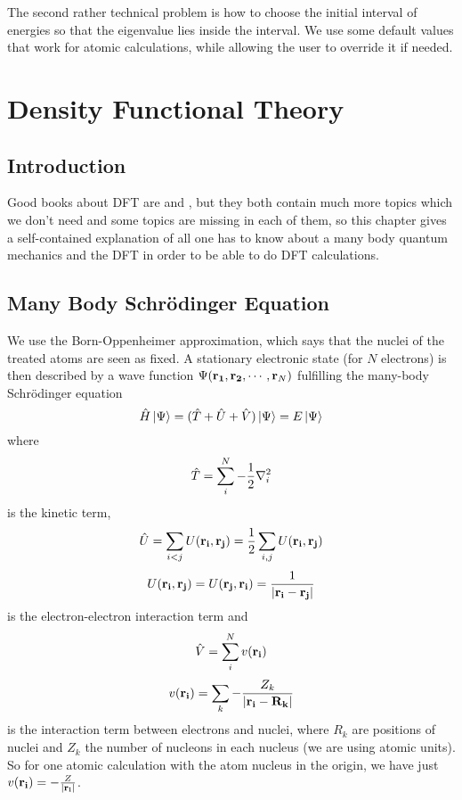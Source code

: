 The second rather technical problem is how to choose the initial interval of energies so that the eigenvalue lies inside the interval. We use some default values that work for atomic calculations, while allowing the user to override it if needed.


\section{Density Functional Theory}

\subsection{Introduction}

Good books about DFT are \cite{DFT} and \cite{martin}, but they both contain much more topics which we don't need and some topics are missing in each of them, so this chapter gives a self-contained explanation of all one has to know about a many body quantum mechanics and the DFT in order to be able to do DFT calculations.

\subsection{Many Body Schrödinger Equation}

We use the Born-Oppenheimer approximation, which says that the nuclei of the treated atoms are seen as fixed. A stationary electronic state (for $N$ electrons) is then described by a wave function $\Psi({\bf r_1},{\bf r_2},\cdots,{\bf r}_N)$ fulfilling the many-body Schrödinger equation 
\begin{equation*}
  \hat H\mathinner{|{\Psi}\rangle}=(\hat T+\hat U+\hat V)\mathinner{|{\Psi}\rangle}=E\mathinner{|{\Psi}\rangle}
\end{equation*}
where 
\begin{equation*}
  \hat T = \sum_i^N -{1\over2}\nabla_i^2
\end{equation*}
is the kinetic term, 
\begin{equation*}
  \hat U = \sum_{i<j}U({\bf r_i},{\bf r_j})= {1\over2}\sum_{i,j}U({\bf r_i},{\bf r_j})
\end{equation*}
\begin{equation*}
  U({\bf r_i},{\bf r_j})=U({\bf r_j},{\bf r_i})={1\over|{\bf r_i}-{\bf r_j}|}
\end{equation*}
is the electron-electron interaction term and 
\begin{equation*}
  \hat V = \sum_i^N v({\bf r_i})
\end{equation*}
\begin{equation*}
  v({\bf r_i})=\sum_k -{Z_k\over|{\bf r_i}-{\bf R_k}|}
\end{equation*}
is the interaction term between electrons and nuclei, where $R_k$ are positions of nuclei and $Z_k$ the number of nucleons in each nucleus (we are using atomic units). So for one atomic calculation with the atom nucleus in the origin, we have just $v({\bf r_i})=-{Z\over|{\bf r_i}|}$.

